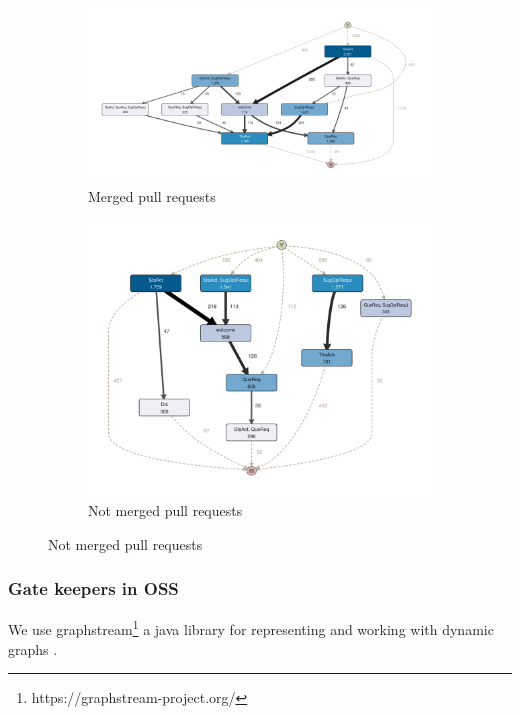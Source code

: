 \begin{figure}[h]
	\centering
	\begin{subfigure}[b]{\linewidth}
		\includegraphics[width=.98\linewidth]{figures/merged-a25-p0}
		\caption{Merged pull requests}
	\end{subfigure}
%
	\begin{subfigure}[b]{\linewidth}
		\includegraphics[width=.98\linewidth]{figures/not-merged-a25-p0}
		\caption{Not merged pull requests}
	\end{subfigure}
	\label{fig:speechActProcess}
\end{figure}

\subsubsection{Gate keepers in OSS}

We use graphstream\footnote{https://graphstream-project.org/} a java library for representing and working with dynamic graphs \citep{DBLP:journals/corr/abs-0803-2093}. 

